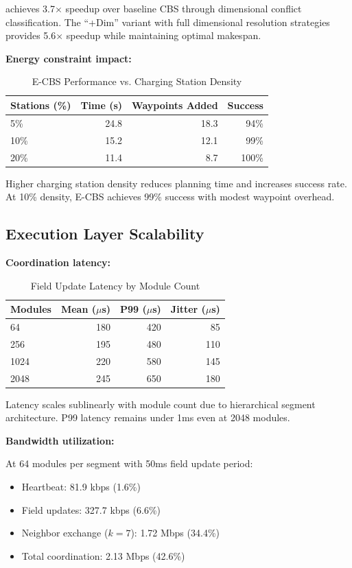 \mixedcbs{} achieves 3.7$\times$ speedup over baseline CBS through dimensional conflict classification. The ``+Dim'' variant with full dimensional resolution strategies provides 5.6$\times$ speedup while maintaining optimal makespan.

\textbf{Energy constraint impact:}

\begin{table}[htbp]
\centering
\caption{E-CBS Performance vs. Charging Station Density}
\label{tab:ecbs}
\begin{tabular}{@{}lrrr@{}}
\toprule
Stations (\%) & Time (s) & Waypoints Added & Success \\
\midrule
5\% & 24.8 & 18.3 & 94\% \\
10\% & 15.2 & 12.1 & 99\% \\
20\% & 11.4 & 8.7 & 100\% \\
\bottomrule
\end{tabular}
\end{table}

Higher charging station density reduces planning time and increases success rate. At 10\% density, E-CBS achieves 99\% success with modest waypoint overhead.

\subsection{Execution Layer Scalability}

\textbf{Coordination latency:}

\begin{table}[htbp]
\centering
\caption{Field Update Latency by Module Count}
\label{tab:latency}
\begin{tabular}{@{}lrrr@{}}
\toprule
Modules & Mean ($\mu$s) & P99 ($\mu$s) & Jitter ($\mu$s) \\
\midrule
64 & 180 & 420 & 85 \\
256 & 195 & 480 & 110 \\
1024 & 220 & 580 & 145 \\
2048 & 245 & 650 & 180 \\
\bottomrule
\end{tabular}
\end{table}

Latency scales sublinearly with module count due to hierarchical segment architecture. P99 latency remains under 1ms even at 2048 modules.

\textbf{Bandwidth utilization:}

At 64 modules per segment with 50ms field update period:
\begin{itemize}
    \item Heartbeat: 81.9 kbps (1.6\%)
    \item Field updates: 327.7 kbps (6.6\%)
    \item Neighbor exchange ($k=7$): 1.72 Mbps (34.4\%)
    \item Total coordination: 2.13 Mbps (42.6\%)
\end{itemize}

